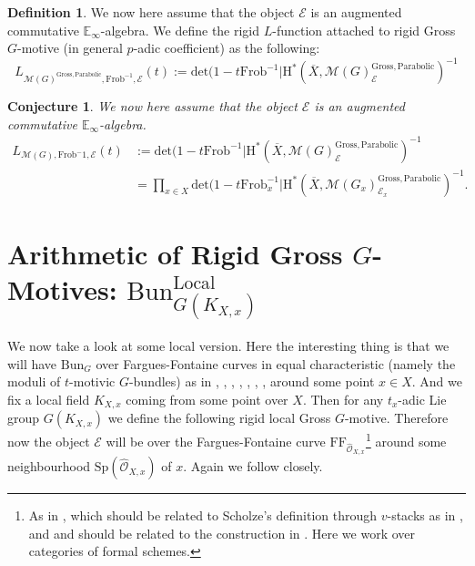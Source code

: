 \documentclass[11pt]{book}
\newtheorem{conjecture}[theorem]{Conjecture}
\theoremstyle{definition}
\newtheorem{definition}[theorem]{Definition}
\numberwithin{equation}{section}
\begin{document}
\begin{definition}
We now here assume that the object $\mathcal{E}$ is an augmented commutative $\mathbb{E}_\infty$-algebra. We define the rigid $L$-function attached to rigid Gross $G$-motive (in general $p$-adic coefficient) as the following:
\begin{displaymath}
L_{\mathcal{M}(G)^\mathrm{Gross,Parabolic},\mathrm{Frob}^{-1},\mathcal{E}}(t):=\mathrm{det}(1-t\mathrm{Frob}^{-1}|\mathrm{H}^*(\overline{X},\mathcal{M}(G)^\mathrm{Gross,Parabolic}_\mathcal{E})^{-1}
\end{displaymath}
\end{definition}


\begin{conjecture}
We now here assume that the object $\mathcal{E}$ is an augmented commutative $\mathbb{E}_\infty$-algebra.
\begin{align}
L_{\mathcal{M}(G),\mathrm{Frob}^-1,\mathcal{E}}(t)&:=\mathrm{det}(1-t\mathrm{Frob}^{-1}|\mathrm{H}^*(\overline{X},\mathcal{M}(G)^\mathrm{Gross,Parabolic}_\mathcal{E})^{-1}\\
&=\prod_{x\in X}\mathrm{det}(1-t\mathrm{Frob}_x^{-1}|\mathrm{H}^*(\overline{X},\mathcal{M}(G_x)^\mathrm{Gross,Parabolic}_{\mathcal{E}_x})^{-1}.
\end{align}

\end{conjecture}





\newpage
\section{Arithmetic of Rigid Gross $G$-Motives: $\mathrm{Bun}^\mathrm{Local}_{G(K_{X,x})}$}

\indent We now take a look at some local version. Here the interesting thing is that we will have $\mathrm{Bun}_G$ over Fargues-Fontaine curves in equal characteristic (namely the moduli of $t$-motivic $G$-bundles) as in \cite{FF}, \cite{FS}, \cite{GL2}, \cite{HP}, \cite{KL1}, \cite{KL2}, \cite{SW}, around some point $x\in X$. And we fix a local field $K_{X,x}$ coming from some point over $X$. Then for any $t_x$-adic Lie group $G(K_{X,x})$ we define the following rigid local Gross $G$-motive. Therefore now the object $\mathcal{E}$ will be over the Fargues-Fontaine curve $\mathrm{FF}_{\widehat{\mathcal{O}}_{X,x}}$\footnote{As in \cite{GL2}, which should be related to Scholze's definition through $v$-stacks as in \cite{FS}, \cite{SW} and \cite{Sch} and should be related to the construction in \cite{KL2}. Here we work over categories of formal schemes.} around some neighbourhood $\mathrm{Sp}(\widehat{\mathcal{O}}_{X,x})$ of $x$. Again we follow \cite{GL1} closely.
\end{document}
